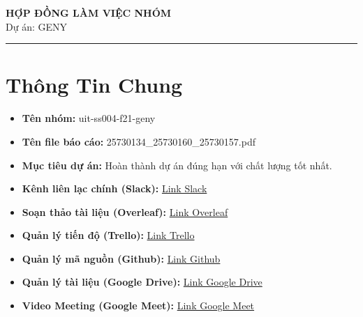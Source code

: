 \documentclass[12pt,a4paper]{article}
\begin{document}

\setlength{\parindent}{0pt}
\setlength{\parskip}{0pt}
\singlespacing

\begin{center}
    {\LARGE \textbf{HỢP ĐỒNG LÀM VIỆC NHÓM}} \\[10pt]
    {\large Dự án: GENY}
\end{center}

\vspace{5pt} 
\hrule
\vspace{5pt} 

\section{Thông Tin Chung} 
\begin{itemize}[label=--, itemsep=5pt]
    \item \textbf{Tên nhóm:} uit-ss004-f21-geny 
    \item \textbf{Tên file báo cáo:} 25730134\_25730160\_25730157.pdf 
    \item \textbf{Mục tiêu dự án:} Hoàn thành dự án đúng hạn với chất lượng tốt nhất.
    \item \textbf{Kênh liên lạc chính (Slack):} \href{https://ss004f21.slack.com/archives/C0ANP80FNSZ}{Link Slack}
    \item \textbf{Soạn thảo tài liệu (Overleaf):} \href{https://www.overleaf.com/read/phtyfmppvghp#c30e2d}{Link Overleaf}
    \item \textbf{Quản lý tiến độ (Trello):} \href{https://trello.com/b/GkDyf06n/geny}{Link Trello}
    \item \textbf{Quản lý mã nguồn (Github):} \href{https://github.com/phuctanpham/geny}{Link Github}
    \item \textbf{Quản lý tài liệu (Google Drive):} \href{https://drive.google.com/drive/folders/1IEzBxhfb_4P6zgbntiNNtDTZ6AZwMpZC?usp=sharing}{Link Google Drive}
    \item \textbf{Video Meeting (Google Meet):} \href{https://meet.google.com/owo-iige-rum}{Link Google Meet}
\end{itemize}
\end{document}
